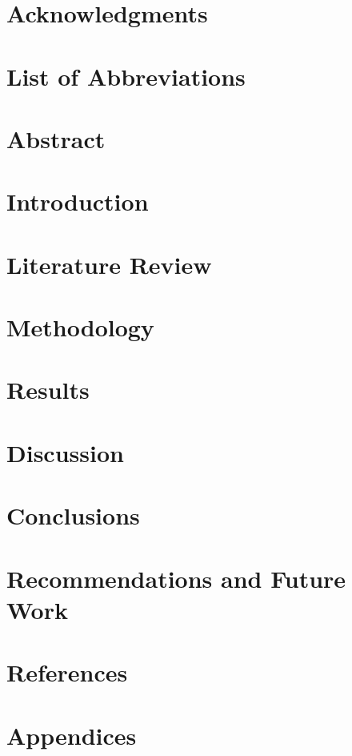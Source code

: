 \documentclass[12pt]{article}
\begin{document}

\restoregeometry

\section*{Acknowledgments}

\pagebreak

\setcounter{tocdepth}{5}
\tableofcontents
\pagebreak

\listoffigures
\pagebreak
\listoftables
\pagebreak

\justify

\section*{List of Abbreviations}

\pagebreak

\section*{Abstract}

\pagebreak

\section{Introduction}
\label{ch:intro}

\pagebreak

\section{Literature Review}

\pagebreak

\section{Methodology}

\pagebreak

\section{Results}

\pagebreak

\section{Discussion}
\label{ch:threats}

\pagebreak

\section{Conclusions}
\label{ch:conclusion}

\pagebreak

\section{Recommendations and Future Work} \label{sec:recommendations}

\pagebreak

\section{References}
\label{sec:ref}
\printbibliography[heading=none]
\pagebreak

\section{Appendices}

\end{document}

